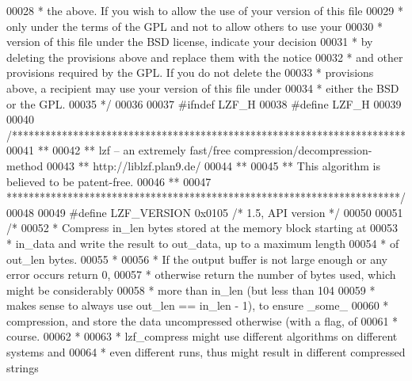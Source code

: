 \begin{DoxyCode}
00028 \textcolor{comment}{ * the above. If you wish to allow the use of your version of this file}
00029 \textcolor{comment}{ * only under the terms of the GPL and not to allow others to use your}
00030 \textcolor{comment}{ * version of this file under the BSD license, indicate your decision}
00031 \textcolor{comment}{ * by deleting the provisions above and replace them with the notice}
00032 \textcolor{comment}{ * and other provisions required by the GPL. If you do not delete the}
00033 \textcolor{comment}{ * provisions above, a recipient may use your version of this file under}
00034 \textcolor{comment}{ * either the BSD or the GPL.}
00035 \textcolor{comment}{ */}
00036 
00037 \textcolor{preprocessor}{#}\textcolor{preprocessor}{ifndef} \textcolor{preprocessor}{LZF\_H}
00038 \textcolor{preprocessor}{#}\textcolor{preprocessor}{define} \textcolor{preprocessor}{LZF\_H}
00039 
00040 \textcolor{comment}{/***********************************************************************}
00041 \textcolor{comment}{**}
00042 \textcolor{comment}{**  lzf -- an extremely fast/free compression/decompression-method}
00043 \textcolor{comment}{**  http://liblzf.plan9.de/}
00044 \textcolor{comment}{**}
00045 \textcolor{comment}{**  This algorithm is believed to be patent-free.}
00046 \textcolor{comment}{**}
00047 \textcolor{comment}{***********************************************************************/}
00048 
00049 \textcolor{preprocessor}{#}\textcolor{preprocessor}{define} \textcolor{preprocessor}{LZF\_VERSION} 0x0105 \textcolor{comment}{/* 1.5, API version */}
00050 
00051 \textcolor{comment}{/*}
00052 \textcolor{comment}{ * Compress in\_len bytes stored at the memory block starting at}
00053 \textcolor{comment}{ * in\_data and write the result to out\_data, up to a maximum length}
00054 \textcolor{comment}{ * of out\_len bytes.}
00055 \textcolor{comment}{ *}
00056 \textcolor{comment}{ * If the output buffer is not large enough or any error occurs return 0,}
00057 \textcolor{comment}{ * otherwise return the number of bytes used, which might be considerably}
00058 \textcolor{comment}{ * more than in\_len (but less than 104%
00059 \textcolor{comment}{ * makes sense to always use out\_len == in\_len - 1), to ensure \_some\_}
00060 \textcolor{comment}{ * compression, and store the data uncompressed otherwise (with a flag, of}
00061 \textcolor{comment}{ * course.}
00062 \textcolor{comment}{ *}
00063 \textcolor{comment}{ * lzf\_compress might use different algorithms on different systems and}
00064 \textcolor{comment}{ * even different runs, thus might result in different compressed strings}
}
\end{DoxyCode}
